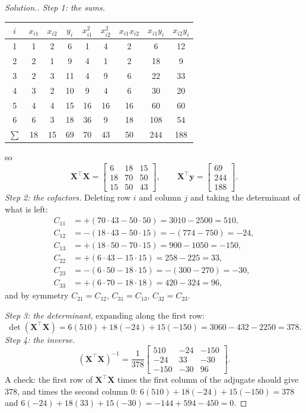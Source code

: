 \documentclass[11pt,a4paper]{article}
\numberwithin{equation}{section}
\theoremstyle{definition}
\newenvironment{solution}
  {\renewcommand{\qedsymbol}{}\begin{proof}[\textit{Solution}.]}
  {\end{proof}}
\begin{document}
\begin{solution}
\emph{Step 1: the sums.}
\begin{center}
\begin{tabular}{c|cccccccc}
$i$ & $x_{i1}$ & $x_{i2}$ & $y_i$ & $x_{i1}^2$ & $x_{i2}^2$ & $x_{i1}x_{i2}$ & $x_{i1}y_i$ & $x_{i2}y_i$ \\
\hline
1 & 1 & 2 & 6 & 1 & 4 & 2 & 6 & 12 \\
2 & 2 & 1 & 9 & 4 & 1 & 2 & 18 & 9 \\
3 & 2 & 3 & 11 & 4 & 9 & 6 & 22 & 33 \\
4 & 3 & 2 & 10 & 9 & 4 & 6 & 30 & 20 \\
5 & 4 & 4 & 15 & 16 & 16 & 16 & 60 & 60 \\
6 & 6 & 3 & 18 & 36 & 9 & 18 & 108 & 54 \\
\hline
$\sum$ & 18 & 15 & 69 & 70 & 43 & 50 & 244 & 188 \\
\end{tabular}
\end{center}
so
\[
\mathbf{X}^\top\mathbf{X} = \begin{bmatrix} 6 & 18 & 15 \\ 18 & 70 & 50 \\ 15 & 50 & 43 \end{bmatrix},
\qquad
\mathbf{X}^\top\mathbf{y} = \begin{bmatrix} 69 \\ 244 \\ 188 \end{bmatrix} .
\]
\emph{Step 2: the cofactors.} Deleting row $i$ and column $j$ and taking the determinant of
what is left:
\begin{align*}
C_{11} &= +(70 \cdot 43 - 50 \cdot 50) = 3010 - 2500 = 510, \\
C_{12} &= -(18 \cdot 43 - 50 \cdot 15) = -(774 - 750) = -24, \\
C_{13} &= +(18 \cdot 50 - 70 \cdot 15) = 900 - 1050 = -150, \\
C_{22} &= +(6 \cdot 43 - 15 \cdot 15) = 258 - 225 = 33, \\
C_{23} &= -(6 \cdot 50 - 18 \cdot 15) = -(300 - 270) = -30, \\
C_{33} &= +(6 \cdot 70 - 18 \cdot 18) = 420 - 324 = 96 ,
\end{align*}
and by symmetry $C_{21} = C_{12}$, $C_{31} = C_{13}$, $C_{32} = C_{23}$.

\emph{Step 3: the determinant}, expanding along the first row:
\[
\det(\mathbf{X}^\top\mathbf{X}) = 6(510) + 18(-24) + 15(-150) = 3060 - 432 - 2250 = 378 .
\]
\emph{Step 4: the inverse.}
\[
(\mathbf{X}^\top\mathbf{X})^{-1} = \frac{1}{378}
\begin{bmatrix} 510 & -24 & -150 \\ -24 & 33 & -30 \\ -150 & -30 & 96 \end{bmatrix} .
\]
A check: the first row of $\mathbf{X}^\top\mathbf{X}$ times the first column of the adjugate
should give $378$, and times the second column $0$:
$6(510) + 18(-24) + 15(-150) = 378$ and $6(-24) + 18(33) + 15(-30) = -144 + 594 - 450 = 0$.


\end{solution}
\end{document}
